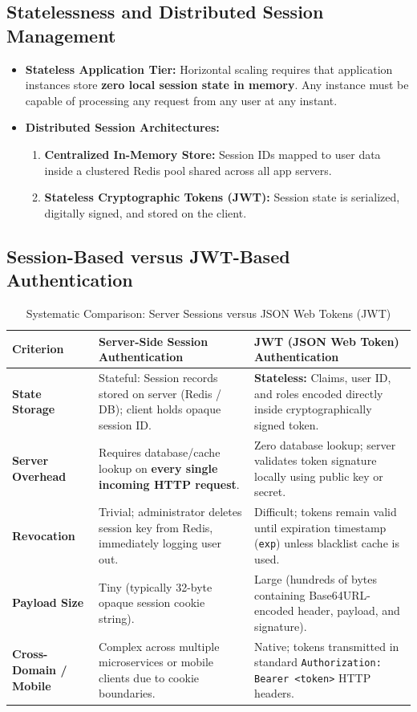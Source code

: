 \subsection{Statelessness and Distributed Session Management}
\begin{itemize}
    \item \textbf{Stateless Application Tier:} Horizontal scaling requires that application instances store \textbf{zero local session state in memory}. Any instance must be capable of processing any request from any user at any instant.
    \item \textbf{Distributed Session Architectures:}
    \begin{enumerate}
        \item \textbf{Centralized In-Memory Store:} Session IDs mapped to user data inside a clustered Redis pool shared across all app servers.
        \item \textbf{Stateless Cryptographic Tokens (JWT):} Session state is serialized, digitally signed, and stored on the client.
    \end{enumerate}
\end{itemize}

\subsection{Session-Based versus JWT-Based Authentication}
\begin{table}[htbp]
\centering
\small
\caption{Systematic Comparison: Server Sessions versus JSON Web Tokens (JWT)}
\label{tab:sessions_vs_jwt}
\begin{tabularx}{\textwidth}{l p{5cm} X}
\toprule
\textbf{Criterion} & \textbf{Server-Side Session Authentication} & \textbf{JWT (JSON Web Token) Authentication} \\
\midrule
\textbf{State Storage} & Stateful: Session records stored on server (Redis / DB); client holds opaque session ID. & \textbf{Stateless:} Claims, user ID, and roles encoded directly inside cryptographically signed token. \\
\textbf{Server Overhead} & Requires database/cache lookup on \textbf{every single incoming HTTP request}. & Zero database lookup; server validates token signature locally using public key or secret. \\
\textbf{Revocation} & Trivial; administrator deletes session key from Redis, immediately logging user out. & Difficult; tokens remain valid until expiration timestamp (\texttt{exp}) unless blacklist cache is used. \\
\textbf{Payload Size} & Tiny (typically 32-byte opaque session cookie string). & Large (hundreds of bytes containing Base64URL-encoded header, payload, and signature). \\
\textbf{Cross-Domain / Mobile} & Complex across multiple microservices or mobile clients due to cookie boundaries. & Native; tokens transmitted in standard \texttt{Authorization: Bearer <token>} HTTP headers. \\
\bottomrule
\end{tabularx}
\end{table}


